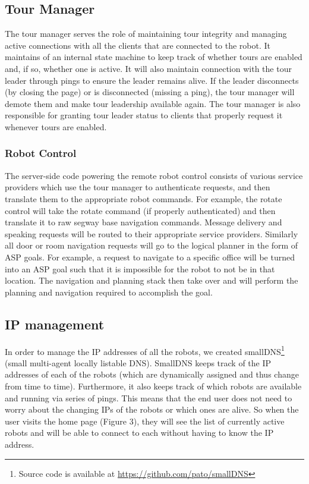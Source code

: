 \documentclass[
  oneside,
  11pt, a4paper,
  footinclude=true,
  headinclude=true,
  cleardoublepage=empty
]{article}
\begin{document}
\subsection{Tour Manager}

The tour manager serves the role of maintaining tour integrity and managing
active connections with all the clients that are connected to the robot. It
maintains of an internal state machine to keep track of whether tours are
enabled and, if so, whether one is active. It will also maintain connection
with the tour leader through pings to ensure the leader remains alive. If the
leader disconnects (by closing the page) or is disconnected (missing a ping),
the tour manager will demote them and make tour leadership available again. The
tour manager is also responsible for granting tour leader status to clients
that properly request it whenever tours are enabled.

\subsubsection{Robot Control}

The server-side code powering the remote robot control consists of various
service providers which use the tour manager to authenticate requests, and then
translate them to the appropriate robot commands. For example, the rotate
control will take the rotate command (if properly authenticated) and then
translate it to raw segway base navigation commands. Message delivery and
speaking requests will be routed to their appropriate service providers.
Similarly all door or room navigation requests will go to the logical planner
in the form of ASP goals. For example, a request to navigate to a specific
office will be turned into an ASP goal such that it is impossible for the robot
to not be in that location. The navigation and planning stack then take over
and will perform the planning and navigation required to accomplish the goal.

\subsection{IP management}

In order to manage the IP addresses of all the robots, we created
smallDNS\footnote{Source code is available at
\url{https://github.com/pato/smallDNS}} (small multi-agent locally listable
DNS). SmallDNS keeps track of the IP addresses of each of the robots (which are
dynamically assigned and thus change from time to time). Furthermore, it also
keeps track of which robots are available and running via series of pings. This
means that the end user does not need to worry about the changing IPs of the
robots or which ones are alive. So when the user visits the home page (Figure
3), they will see the list of currently active robots and will be able to
connect to each without having to know the IP address.
\end{document}
